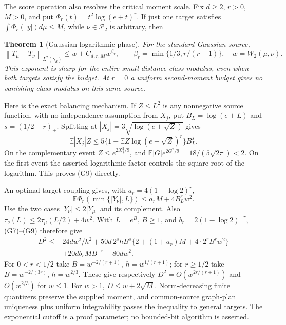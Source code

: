 \documentclass[11pt]{article}
\newtheorem{theorem}{Theorem}
\newcommand{\norm}[1]{\left\lVert#1\right\rVert}
\begin{document}
The score operation also resolves the critical moment scale. Fix $d\ge2$, $r>0$, $M>0$, and put $\Phi_r(t)=t^2\log(e+t)^r$. If just one target satisfies $\int\Phi_r(|y|)d\mu\le M$, while $\nu\in\mathcal P_2$ is arbitrary, then
\begin{theorem}[Gaussian logarithmic phase]\label{thm:logphase}
For the standard Gaussian source,
\[
\norm{T_\mu-T_\nu}_{L^2(\gamma_d)}
\le w+C_{d,r,M}w^{\beta_r},\qquad
\beta_r=\min\{1/3,r/(r+1)\},\quad w=W_2(\mu,\nu).
\tag{G8}
\]
This exponent is sharp for the entire small-distance class modulus, even when both targets satisfy the budget. At $r=0$ a uniform second-moment budget gives no vanishing class modulus on this same source.
\end{theorem}

Here is the exact balancing mechanism. If $Z\le L^2$ is any nonnegative source function, with no independence assumption from $X_j$, put $B_L=\log(e+L)$ and $s=(1/2-r)_+$. Splitting at $|X_j|=3\sqrt{\log(e+\sqrt Z)}$ gives
\[
\mathbb E|X_j|Z\le5\{1+\mathbb E Z\log(e+\sqrt Z)^r\}B_L^s.
\tag{G9}
\]
On the complementary event $Z\le e^{2X_j^2/9}$, and $\mathbb E|G|e^{2G^2/9}=18/(5\sqrt{2\pi})<2$. On the first event the asserted logarithmic factor controls the square root of the logarithm. This proves (G9) directly.

An optimal target coupling gives, with $a_r=4(1+\log2)^r$,
\[
\mathbb E\Phi_r(\min\{|Y_\nu|,L\})\le a_rM+4B_L^r w^2.
\]
Use the two cases $|Y_\nu|\le2|Y_\mu|$ and its complement. Also $\tau_\nu(L)\le2\tau_\mu(L/2)+4w^2$. With $L=e^B$, $B\ge1$, and $b_r=2(1-\log2)^{-r}$, (G7)--(G9) therefore give
\[
\begin{split}
D^2\le{}&24d w^2/h^2
+50d\,2^s hB^s\{2+(1+a_r)M+4\cdot2^rB^r w^2\}\\
&+20db_rM B^{-r}+80dw^2.
\end{split}
\tag{G10}
\]
For $0<r<1/2$ take $B=w^{-2/(r+1)}$, $h=w^{1/(r+1)}$; for $r\ge1/2$ take $B=w^{-2/(3r)}$, $h=w^{2/3}$. These give respectively $D^2=O(w^{2r/(r+1)})$ and $O(w^{2/3})$ for $w\le1$. For $w>1$, $D\le w+2\sqrt M$. Norm-decreasing finite quantizers preserve the supplied moment, and common-source graph-plan uniqueness plus uniform integrability passes the inequality to general targets. The exponential cutoff is a proof parameter; no bounded-bit algorithm is asserted.
\end{document}
